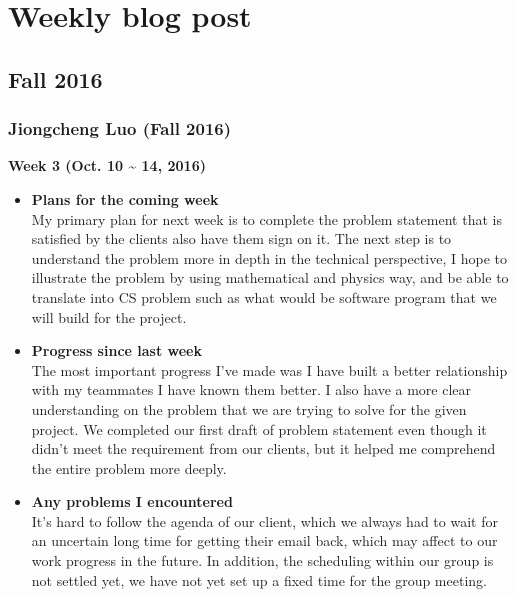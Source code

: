 \newpage
\section{Weekly blog post}
	\subsection{Fall 2016}
		\subsubsection{Jiongcheng Luo (Fall 2016)}
		\vspace{0.5cm}

		\begin{center}
			\textbf{Week 3 (Oct. 10 {\textasciitilde{}} 14, 2016)}
		\end{center}
		\begin{itemize}
			\item \textbf{Plans for the coming week}
			\\My primary plan for next week is to complete the problem statement that is satisfied by the clients also have them sign on it. The next step is to understand the problem more in depth in the technical perspective, I hope to illustrate the problem by using mathematical and physics way, and be able to translate into CS problem such as what would be software program that we will build for the project.\\

			\item \textbf{Progress since last week}
			\\The most important progress I've made was I have built a better relationship with my teammates I have known them better. I also have a more clear understanding on the problem that we are trying to solve for the given project. We completed our first draft of problem statement even though it didn't meet the requirement from our clients, but it helped me comprehend the entire problem more deeply.\\

			\item \textbf{Any problems I encountered}
			\\It's hard to follow the agenda of our client, which we always had to wait for an uncertain long time for getting their email back, which may affect to our work progress in the future. In addition, the scheduling within our group is not settled yet, we have not yet set up a fixed time for the group meeting.\\
		\end{itemize}

